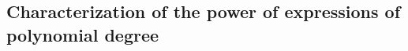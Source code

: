 \subsection{Characterization of the power of \langfor expressions of polynomial degree}\label{subsec:poldegree}
% 
%
%
%
%
